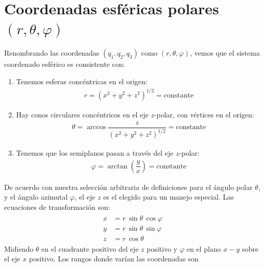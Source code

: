\section{Coordenadas esféricas polares $(r,\theta, \varphi)$}
Renombrando las coordenadas $(q_{1}, q_{2}, q_{3})$ como $(r, \theta, \varphi)$, vemos que el sistema coordenado esférico es consistente con:
\begin{enumerate}
\item Tenemos esferas concéntricas en el origen:
\begin{align*}
r = (x^{2} + y^{2} + z^{2})^{1/2} =  \text{constante}
\end{align*}
\item Hay conos circulares concéntricos en el eje $z$-polar, con vértices en el origen:
\begin{align*}
\theta = \arccos \dfrac{z}{(x^{2} +y^{2} + z^{2})^{1/2}} = \text{constante}
\end{align*}
\item Tenemos que los semiplanos pasan a través del eje $z$-polar:
\begin{align*}
\varphi = \arctan\left(\dfrac{y}{x} \right) =  \text{constante}
\end{align*}
\end{enumerate}
De acuerdo con nuestra selección arbitraria de definiciones para el ángulo polar $\theta$, y el ángulo azimutal $\varphi$, el eje $z$ es el elegido para un manejo especial. Las ecuaciones de transformación son:
\begin{align}
\begin{aligned}
x &= r \, \sin \theta \, \cos \varphi \\
y &= r \, \sin \theta \, \sin \varphi \\
z &= r \, \cos \theta
\end{aligned}
\label{eq:ecuacion_02_038}
\end{align}
Midiendo $\theta$ en el cuadrante positivo del eje $z$ positivo y $\varphi$ en el plano $x-y$ sobre el eje $x$ positivo. Los rangos donde varían las coordenadas son
